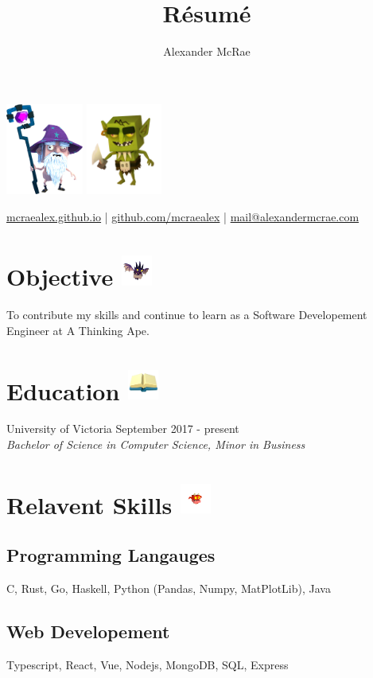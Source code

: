 \documentclass{article}
\makeatletter
\renewcommand{\maketitle}{
\begin{center}
\includegraphics[height=3cm]{cedric-desktop.png}
{\huge \bfseries \theauthor}
\includegraphics[height=3cm]{goblin.png}

\vspace{0.25em}
\url{mcraealex.github.io} | \url{github.com/mcraealex} | \href{mailto:mail@alexandermcrae.com}{mail@alexandermcrae.com}
\end{center}
}
\makeatother
\begin{document}
\title{R\'esum\'e}
\author{Alexander McRae}

\maketitle

\section{Objective \protect\includegraphics[height=1cm]{Quartz.png}}

To contribute my skills and continue to learn as a Software Developement Engineer at A Thinking Ape.

\section{Education \protect\includegraphics[height=1cm]{Education.png}}

University of Victoria \hfill September 2017 - present\\
\textit{Bachelor of Science in Computer Science, Minor in Business}

\section{Relavent Skills \protect\includegraphics[height=1cm]{Ruby.png}}

\subsection{Programming Langauges}

C, Rust, Go, Haskell, Python (Pandas, Numpy, MatPlotLib), Java

\subsection{Web Developement}

Typescript, React, Vue, Nodejs, MongoDB, SQL, Express
\end{document}
